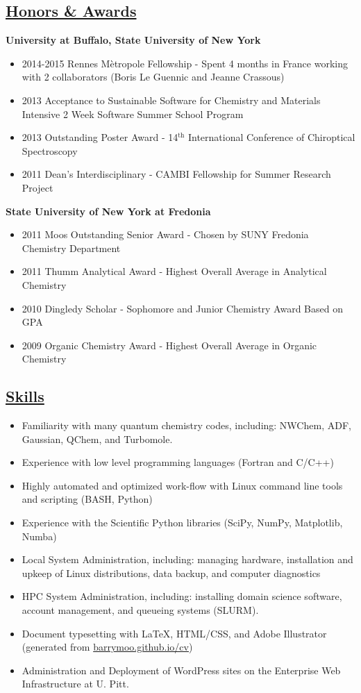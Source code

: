 \documentclass[12pt,letterpaper,oneside]{article}
\newcommand{\MYh}[1]{ \underline{#1} }
\begin{document}
\subsection*{\MYh{Honors \& Awards}}\textbf{University at Buffalo, State University of New York}
\begin{itemize}
	\item 2014-2015 Rennes M\`etropole Fellowship - Spent 4 months in France working with 2 collaborators (Boris Le Guennic and Jeanne Crassous)
	\item 2013 Acceptance to Sustainable Software for Chemistry and Materials Intensive 2 Week Software Summer School Program
	\item 2013 Outstanding Poster Award - 14$^\textrm{th}$ International Conference of Chiroptical Spectroscopy
	\item 2011 Dean's Interdisciplinary - CAMBI Fellowship for Summer Research Project
\end{itemize}\textbf{State University of New York at Fredonia}
\begin{itemize}
	\item 2011 Moos Outstanding Senior Award - Chosen by SUNY Fredonia Chemistry Department
	\item 2011 Thumm Analytical Award - Highest Overall Average in Analytical Chemistry
	\item 2010 Dingledy Scholar - Sophomore and Junior Chemistry Award Based on GPA
	\item 2009 Organic Chemistry Award - Highest Overall Average in Organic Chemistry
\end{itemize}


\subsection*{\MYh{Skills}}
\begin{itemize}
	\item Familiarity with many quantum chemistry codes, including: NWChem, ADF, Gaussian, QChem, and Turbomole.
	\item Experience with low level programming languages (Fortran and C/C++)
	\item Highly automated and optimized work-flow with Linux command line tools and scripting (BASH, Python)
	\item Experience with the Scientific Python libraries (SciPy, NumPy, Matplotlib, Numba)
	\item Local System Administration, including: managing hardware, installation and upkeep of Linux distributions, data backup, and computer diagnostics
	\item HPC System Administration, including: installing domain science software, account management, and queueing systems (SLURM).
	\item Document typesetting with \LaTeX, HTML/CSS, and Adobe Illustrator (generated from \href{http://barrymoo.github.io/cv}{barrymoo.github.io/cv})
	\item Administration and Deployment of WordPress sites on the Enterprise Web Infrastructure at U. Pitt.
\end{itemize}
\end{document}
